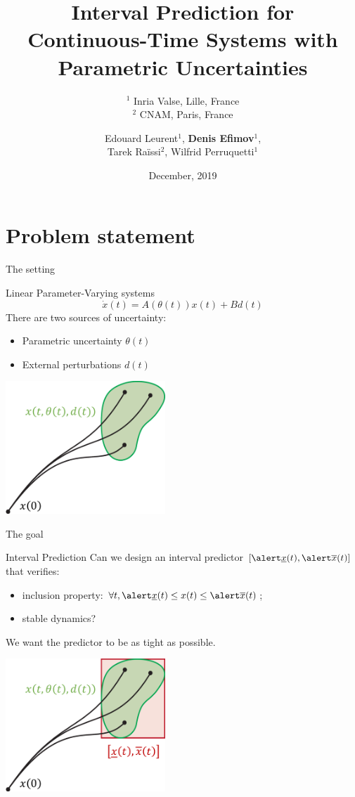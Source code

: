 \documentclass[slideopt,A4,showboxes,svgnames]{beamer}
\title[Interval Prediction with Parametric Uncertainties]{Interval Prediction for \\ Continuous-Time Systems with \\ Parametric Uncertainties}
\subtitle{$^1$ Inria Valse, Lille, France\\
$^2$ CNAM, Paris, France}
\date[December, 2019]{December, 2019}
\author[Denis Efimov]{Edouard Leurent$^1$, \textbf{Denis Efimov}$^1$, \\Tarek Ra\"issi$^2$, Wilfrid Perruquetti$^1$}
\begin{document}
\begin{frame}
    \titlepage
\end{frame}

\frame{\tocpage}
 
\section{Problem statement}

\frame{\sectionpage}

\begin{frame}{The setting}
\begin{block}{Linear Parameter-Varying systems}
	\begin{equation*}
	\dot{x}(t)=A(\theta(t))x(t)+Bd(t)\label{eq:LPV_syst}
	\end{equation*}
	There are two sources of uncertainty:
	\begin{itemize}
		\item Parametric uncertainty $\theta(t)$
		\item External perturbations $d(t)$
	\end{itemize}
\end{block}

\centering
\includegraphics[width=0.45\textwidth]{img/interval-hull-0}
\end{frame}

\begin{frame}{The goal}
\begin{block}{Interval Prediction}
	Can we design an interval predictor $[\ux, \ox]$ that verifies:
	\vspace*{0.175cm}
	\begin{itemize}
		\item inclusion property: $\forall t, \ux \leq x(t) \leq \ox$;
		\item stable dynamics?
	\end{itemize}
	\vspace*{0.175cm}
	We want the predictor to be as tight as possible.

\end{block}

\centering
\includegraphics[width=0.45\textwidth]{img/interval-hull}
\end{frame}
\end{document}
